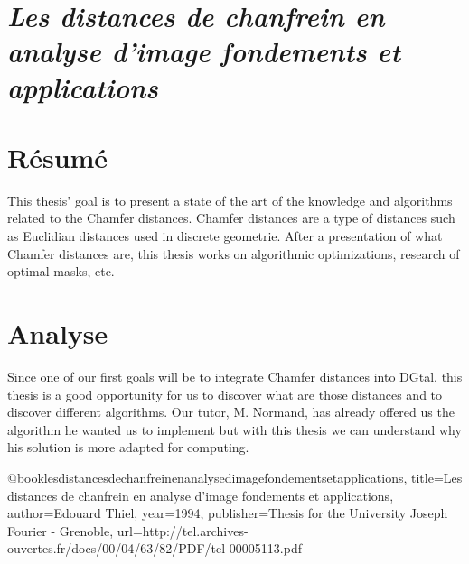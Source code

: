 \documentclass[a4paper,11pt]{report}
\begin{document}
\section{\emph{Les distances de chanfrein en analyse d'image fondements et applications}}

\section{Résumé}

This thesis' goal is to present a state of the art of the knowledge and algorithms related to the Chamfer distances. Chamfer distances are a type of distances such as Euclidian distances used in discrete geometrie. After a presentation of what Chamfer distances are, this thesis works on algorithmic optimizations, research of optimal masks, etc.

\section{Analyse}

Since one of our first goals will be to integrate Chamfer distances into DGtal, this thesis is a good opportunity for us to discover what are those distances and to discover different algorithms. Our tutor, M. Normand, has already offered us the algorithm he wanted us to implement but with this thesis we can understand why his solution is more adapted for computing.


@book{lesdistancesdechanfreinenanalysedimagefondementsetapplications,
title={Les distances de chanfrein en analyse d'image fondements et applications},
author={Edouard Thiel},
  year={1994},
  publisher={Thesis for the University Joseph Fourier - Grenoble},
	url={http://tel.archives-ouvertes.fr/docs/00/04/63/82/PDF/tel-00005113.pdf}
}
\end{document}
